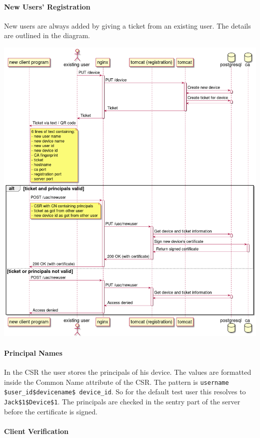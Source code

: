\documentclass{memoir}
\begin{document}
\paragraph{New Users' Registration}
New users are always added by giving a ticket from an existing user. The details are outlined in the diagram.

\includegraphics[width=\linewidth]{diagrams/device-registration.png}

\paragraph{Principal Names}

In the CSR the user stores the principals of his device. The values are formatted inside the Common Name attribute of the CSR. The pattern is \texttt{username \$user\_id\$devicename\$ device\_id}. So for the default test user this resolves to \texttt{Jack\$1\$Device\$1}. The principals are checked in the sentry part of the server before the certificate is signed.

\paragraph{Client Verification}
\end{document}
